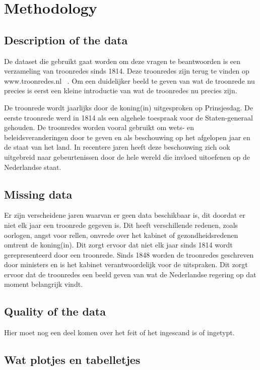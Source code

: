 \section{Methodology}
\label{sec:meth}


\subsection{Description of the data}
De dataset die gebruikt gaat worden om deze vragen te beantwoorden is een verzameling van troonredes sinds 1814. Deze troonredes zijn terug te vinden op www.troonredes.nl~\cite{troonredes} .  Om een duidelijker beeld te geven van wat de troonrede nu precies is eerst een kleine introductie van wat de troonredes nu precies zijn.

De troonrede wordt jaarlijks door de koning(in) uitgesproken op Prinsjesdag. De eerste troonrede werd in 1814 als een algehele toespraak voor de Staten-generaal gehouden. De troonredes worden vooral gebruikt om wets- en beleidsveranderingen door te geven en als beschouwing op het afgelopen jaar en de staat van het land. In recentere jaren heeft deze beschouwing zich ook uitgebreid naar gebeurtenissen door de hele wereld die invloed uitoefenen op de Nederlandse staat.

\subsection{Missing data}
Er zijn verscheidene jaren waarvan er geen data beschikbaar is, dit doordat er niet elk jaar een troonrede gegeven is. Dit heeft verschillende redenen, zoals oorlogen, angst voor rellen, onvrede over het kabinet of gezondheidsredenen omtrent de koning(in). Dit zorgt ervoor dat niet elk jaar sinds 1814 wordt gerepresenteerd door een troonrede. Sinds 1848 worden de troonredes geschreven door ministers en is het kabinet verantwoordelijk voor de uitspraken. Dit zorgt ervoor dat de troonredes een beeld geven van wat de Nederlandse regering op dat moment belangrijk vindt.

\subsection{Quality of the data}
Hier moet nog een deel komen over het feit of het ingescand is of ingetypt.

\pagebreak
\subsection{Wat plotjes en tabelletjes}

